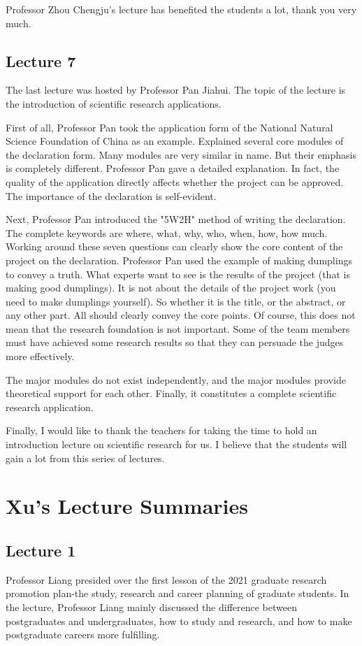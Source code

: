 \documentclass[UTF-8]{ctexart}
\begin{document}
Professor Zhou Chengju’s lecture has benefited the students a lot, thank you very much. 

\subsection{Lecture 7}
The last lecture was hosted by Professor Pan Jiahui. The topic of the lecture is the introduction of scientific research applications.

First of all, Professor Pan took the application form of the National Natural Science Foundation of China as an example. Explained several core modules of the declaration form. Many modules are very similar in name. But their emphasis is completely different. Professor Pan gave a detailed explanation. In fact, the quality of the application directly affects whether the project can be approved. The importance of the declaration is self-evident.


Next, Professor Pan introduced the "5W2H" method of writing the declaration. The complete keywords are where, what, why, who, when, how, how much. Working around these seven questions can clearly show the core content of the project on the declaration. Professor Pan used the example of making dumplings to convey a truth. What experts want to see is the results of the project (that is making good dumplings). It is not about the details of the project work (you need to make dumplings yourself). So whether it is the title, or the abstract, or any other part. All should clearly convey the core points. Of course, this does not mean that the research foundation is not important. Some of the team members must have achieved some research results so that they can persuade the judges more effectively.

The major modules do not exist independently, and the major modules provide theoretical support for each other. Finally, it constitutes a complete scientific research application. 

Finally, I would like to thank the teachers for taking the time to hold an introduction lecture on scientific research for us. I believe that the students will gain a lot from this series of lectures. 


\section{Xu's Lecture Summaries}

\subsection{Lecture 1}
Professor Liang presided over the first lesson of the 2021 graduate research promotion plan-the study, research and career planning of graduate students. In the lecture, Professor Liang mainly discussed the difference between postgraduates and undergraduates, how to study and research, and how to make postgraduate careers more fulfilling.
\end{document}
